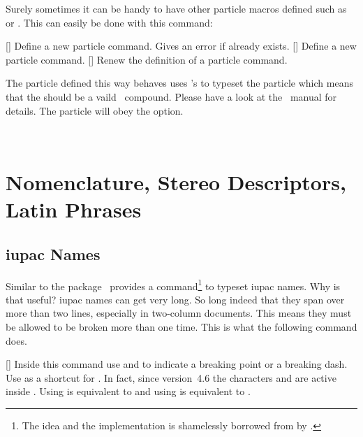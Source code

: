 \documentclass[load-preamble+]{cnltx-doc}
\begin{document}
Surely sometimes it can be handy to have other particle macros defined such as
 or .  This can easily be done with this command:
\begin{commands}
  []
    Define a new particle command.  Gives an error if
     already exists.
  []
    Define a new particle command.
  []
    Renew the definition of a particle command.
\end{commands}
The particle defined this way behaves uses \chemformula's  to typeset
the particle which means that the  should be a vaild
\chemformula\ compound.  Please have a look at the \chemformula\ manual for
details.  The particle will obey the  option.
\begin{example}
  \NewChemParticle\positron{\chembeta+}
  \NewChemParticle\photon{\chemgamma}
  \RenewChemParticle\el{\chembeta-}
  \positron\ \photon\ \el
\end{example}

\section{Nomenclature, Stereo Descriptors, Latin Phrases}\label{sec:stereo}
\subsection{\acs{iupac} Names}

Similar to the  package \chemmacros\ provides a
command\footnote{The idea and the implementation is shamelessly borrowed from
   by \pedersen.} to typeset \ac{iupac} names.  Why is
that useful?  \ac{iupac} names can get very long.  So long indeed that they
span over more than two lines, especially in two-column documents.  This means
they must be allowed to be broken more than one time.  This is what the
following command does.
\begin{commands}
  []
    Inside this command use \cs{\textbar} and \cs{-} to indicate a breaking
    point or a breaking dash.  Use \cs{\textasciicircum} as a shortcut for
    .  In fact, since version~4.6 the
    characters \code{\textbar} and \code{\textasciicircum} are active inside
    . Using \code{\textbar} is equivalent to \cs{\textbar} and using
    \code{\textasciicircum} is equivalent to \cs{\textasciicircum}.
\end{commands}
\end{document}
